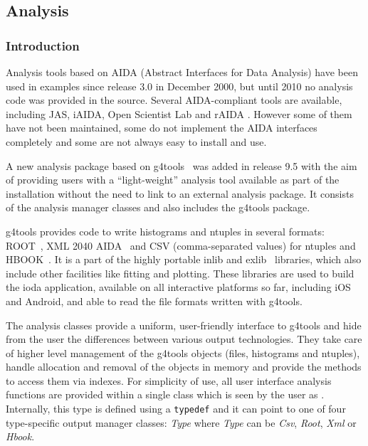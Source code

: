 \label{sec:analysis}

\subsection{\textbf{Analysis}}

\subsubsection{Introduction}
Analysis tools based on AIDA (Abstract Interfaces for Data Analysis) 
\cite{analysis:AIDA} have been used in \Gfour{} examples since release 3.0 in
December 2000, but until 2010 no analysis code was provided in the \Gfour{} 
source.  Several AIDA-compliant tools are available, including JAS, iAIDA, 
Open Scientist Lab and rAIDA \cite{bib:AppDevGuide} .
However some of them have not been maintained, some do not implement the AIDA
interfaces completely and some are not always easy to install and use.

A new analysis package based on g4tools~\cite{analysis:tools} was added in
\Gfour{} release 9.5 with the aim of providing users with a ``light-weight'' 
analysis tool available as part of the \Gfour{} installation without the need to 
link to an external analysis package.  It consists of the analysis manager 
classes and also includes the g4tools package.

g4tools provides code to write histograms and ntuples in several formats: 
ROOT~\cite{analysis:Root}, XML 2040 AIDA~\cite{analysis:AIDA} and CSV 
(comma-separated values) for ntuples and HBOOK~\cite{analysis:HBOOK}. It
is a part of the highly portable inlib and exlib~\cite{analysis:tools} 
libraries, which also include other facilities like fitting and plotting.  These
libraries are used to build the ioda application, available on all interactive
platforms so far, including iOS and Android, and able to read the file formats 
written with g4tools.   

The analysis classes provide a uniform, user-friendly interface to g4tools and 
hide from the user the differences between various output technologies.  They 
take care of higher level management of the g4tools objects (files, histograms
and ntuples), handle allocation and removal of the objects in memory and provide
the methods to access them via indexes.  For simplicity of use, all user 
interface analysis functions are provided within a single class which is seen by
the user as .  Internally, this type is defined using
a \verb"typedef" and it can point to one of four type-specific output manager 
classes: \emph{Type} where \emph{Type} can be 
\emph{Csv}, \emph{Root}, \emph{Xml} or \emph{Hbook}.

